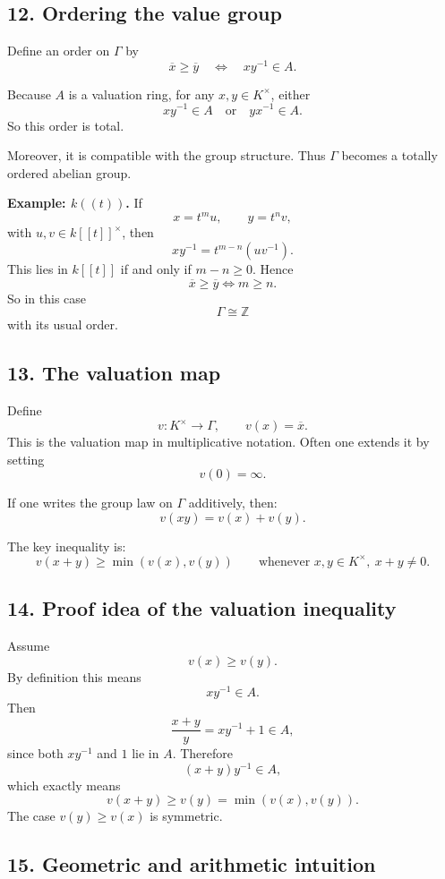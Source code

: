 \documentclass[12pt,a4paper]{article}
\theoremstyle{notespace}
\begin{document}
\subsection*{12. Ordering the value group}

Define an order on \(\Gamma\) by
\[
\overline{x} \ge \overline{y}
\quad \Longleftrightarrow \quad
xy^{-1}\in A.
\]

Because \(A\) is a valuation ring, for any \(x,y\in K^\times\), either
\[
xy^{-1}\in A
\quad \text{or} \quad
yx^{-1}\in A.
\]
So this order is total.

Moreover, it is compatible with the group structure. Thus \(\Gamma\) becomes a totally ordered abelian group.

\textbf{Example: \(k((t))\).}
If
\[
x=t^m u,
\qquad
y=t^n v,
\]
with \(u,v\in k[[t]]^\times\), then
\[
xy^{-1}=t^{m-n}(uv^{-1}).
\]
This lies in \(k[[t]]\) if and only if \(m-n\ge 0\). Hence
\[
\overline{x}\ge \overline{y}
\iff m\ge n.
\]
So in this case
\[
\Gamma \cong \mathbb Z
\]
with its usual order.

\subsection*{13. The valuation map}

Define
\[
v:K^\times \to \Gamma,
\qquad
v(x)=\overline{x}.
\]
This is the valuation map in multiplicative notation. Often one extends it by setting
\[
v(0)=\infty.
\]

If one writes the group law on \(\Gamma\) additively, then:
\[
v(xy)=v(x)+v(y).
\]

The key inequality is:
\[
v(x+y)\ge \min(v(x),v(y))
\qquad \text{whenever } x,y\in K^\times,\ x+y\neq 0.
\]

\subsection*{14. Proof idea of the valuation inequality}

Assume
\[
v(x)\ge v(y).
\]
By definition this means
\[
xy^{-1}\in A.
\]
Then
\[
\frac{x+y}{y}=xy^{-1}+1\in A,
\]
since both \(xy^{-1}\) and \(1\) lie in \(A\). Therefore
\[
(x+y)y^{-1}\in A,
\]
which exactly means
\[
v(x+y)\ge v(y)=\min(v(x),v(y)).
\]
The case \(v(y)\ge v(x)\) is symmetric.

\subsection*{15. Geometric and arithmetic intuition}
\end{document}
